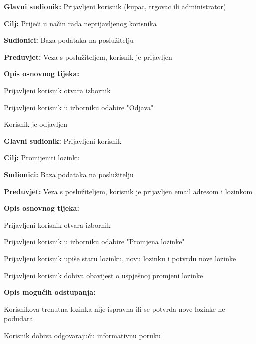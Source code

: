 				
				\noindent {}
				\begin{packed_item}
					\item \textbf{Glavni sudionik:} Prijavljeni korisnik (kupac, trgovac ili administrator)
					\item  \textbf{Cilj:} Prijeći u način rada neprijavljenog korisnika
					\item  \textbf{Sudionici:} Baza podataka na poslužitelju
					\item  \textbf{Preduvjet:} Veza s poslužiteljem, korisnik je prijavljen
					\item  \textbf{Opis osnovnog tijeka:}
					\item[] \begin{packed_enum}
						\item Prijavljeni korisnik otvara izbornik
						\item Prijavljeni korisnik u izborniku odabire "Odjava"
						\item Korisnik je odjavljen
					\end{packed_enum}
				\end{packed_item}
				
			
				
				\noindent \underbar{\textbf{UC15 - Promjena lozinke}}
				\begin{packed_item}
					\item \textbf{Glavni sudionik:} Prijavljeni korisnik
					\item  \textbf{Cilj:} Promijeniti lozinku 
					\item  \textbf{Sudionici:} Baza podataka na poslužitelju
					\item  \textbf{Preduvjet:} Veza s poslužiteljem, korisnik je prijavljen email adresom i lozinkom
					\item  \textbf{Opis osnovnog tijeka:}
					\item[] \begin{packed_enum}
						\item Prijavljeni korisnik otvara izbornik
						\item Prijavljeni korisnik u izborniku odabire "Promjena lozinke"
						\item Prijavljeni korisnik upiše staru lozinku, novu lozinku i potvrdu nove lozinke
						\item Prijavljeni korisnik dobiva obavijest o uspješnoj promjeni lozinke
					\end{packed_enum}
					\item  \textbf{Opis mogućih odstupanja:}
					\item[] \begin{packed_item}
						\item[3.a] Korisnikova trenutna lozinka nije ispravna ili se potvrda nove lozinke ne podudara
						\item[] \begin{packed_enum}
							\item Korisnik dobiva odgovarajuću informativnu poruku
						\end{packed_enum}
					\end{packed_item}
				\end{packed_item}
			

